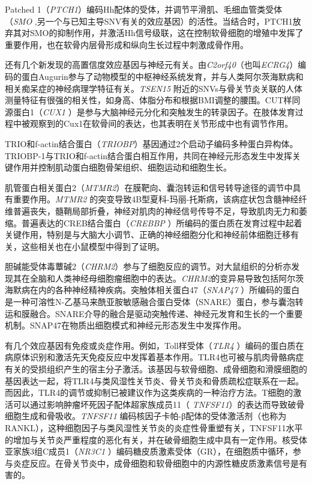 Patched
1（\emph{PTCH1}）编码Hh配体的受体，并调节平滑肌、毛细血管类受体（\emph{SMO}
,另一个与已知主导SNV有关的效应基因）的活性。当结合时，PTCH1放弃其对SMO的抑制作用，并激活Hh信号级联，这在控制软骨细胞的增殖中发挥了重要作用，也在软骨内层骨形成和纵向生长过程中刺激成骨作用。

还有几个新发现的高置信度效应基因与神经元有关。由\emph{C2orf40}（也叫\emph{ECRG4}）编码的蛋白Augurin参与了动物模型的中枢神经系统发育，并与人类阿尔茨海默病和相关痴呆症的神经病理学特征有关。\emph{TSEN15}
附近的SNVs与骨关节炎关联的人体测量特征有很强的相关性，如身高、体脂分布和根据BMI调整的腰围。CUT样同源蛋白1（\emph{CUX1}
）是参与大脑神经元分化和突触发生的转录因子。在肢体发育过程中被观察到的Cux1在软骨间的表达，也其表明在关节形成中也有调节作用。

TRIO和f-actin结合蛋白（\emph{TRIOBP}）基因通过2个启动子编码多种蛋白异构体。TRIOBP-1与TRIO和f-actin结合蛋白相互作用，共同在神经元形态发生中发挥关键作用并控制肌动蛋白细胞骨架组织、细胞运动和细胞生长。

肌管蛋白相关蛋白2（\emph{MTMR2}）在膜靶向、囊泡转运和信号转导途径的调节中具有重要作用。\emph{MTMR2}
的突变导致4B型夏科-玛丽-托斯病，该病症状包含髓神经纤维普遍丧失，髓鞘局部折叠，神经对肌肉的神经信号传导不足，导致肌肉无力和萎缩。普遍表达的CREB结合蛋白（\emph{CREBBP}
）所编码的蛋白质在发育过程中起着关键作用，特别是与大脑大小调节、正确的神经细胞分化和神经前体细胞迁移有关，这些相关也在小鼠模型中得到了证明。

胆碱能受体毒蕈碱2（\emph{CHRM2}）参与了细胞反应的调节。对大鼠组织的分析亦发现其在全脑和人类神经母细胞瘤细胞中的表达。\emph{CHRM2}的变异易导致包括阿尔茨海默病在内的各种神经精神疾病。突触体相关蛋白47（\emph{SNAP47}
）所编码的蛋白是一种可溶性N-乙基马来酰亚胺敏感融合蛋白受体（SNARE）蛋白，参与囊泡转运和膜融合。SNARE介导的融合是驱动突触传递、神经元发育和生长的一个重要机制。SNAP47在物质出细胞模式和神经元形态发生中发挥作用。

有几个效应基因有免疫或炎症作用。例如，Toll样受体（\emph{TLR4}
）编码的蛋白质在病原体识别和激活先天免疫反应中发挥着基本作用。TLR4也可被与肌肉骨骼病症有关的受损组织产生的宿主分子激活。该基因与软骨细胞、成骨细胞和滑膜细胞的基因表达一起，将TLR4与类风湿性关节炎、骨关节炎和骨质疏松症联系在一起。而因此，TLR4的调节或抑制已被建议作为这类疾病的一种治疗方法。T细胞的激活可以通过影响肿瘤坏死因子配体超家族成员11（\emph{
TNFSF11}）的表达而导致破骨细胞生成和骨吸收。\emph{TNFSF11}
编码核因子卡帕-β配体的受体激活剂（也称为RANKL），这种细胞因子与类风湿性关节炎的炎症性骨重塑有关，TNFSF11水平的增加与关节炎严重程度的恶化有关，并在破骨细胞生成中具有一定作用。核受体亚家族3组C成员1（\emph{NR3C1}
）编码糖皮质激素受体（GR），在细胞质中循环，参与炎症反应。在骨关节炎中，成骨细胞和软骨细胞中的内源性糖皮质激素信号是有害的。


